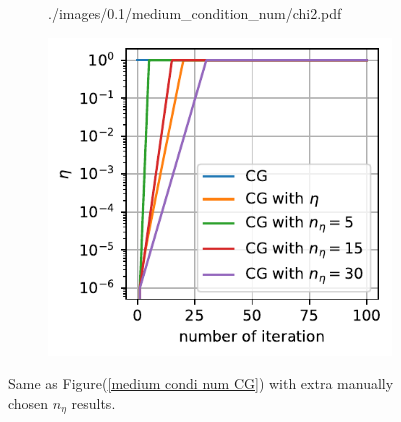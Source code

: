 \documentclass[11pt, letterpaper]{article}
\begin{document}
\begin{figure}[htb]
\begin{subfigure}{0.33\textwidth}
        {./images/0.1/medium_condition_num/chi2.pdf}
    \caption{}
    \label{medium condi num chi2}
\end{subfigure}%
\begin{subfigure}{0.33\textwidth}
    \centering
    \includegraphics[width=\linewidth]
        {./images/0.1/medium_condition_num/eta.pdf}
    \caption{}
    \label{medium condi num eta}
\end{subfigure}
\caption{Same as Figure(\ref{medium condi num CG}) with extra manually chosen 
    $n_{\eta}$ results.
}
\label{medium condi num}
\end{figure}
\end{document}

